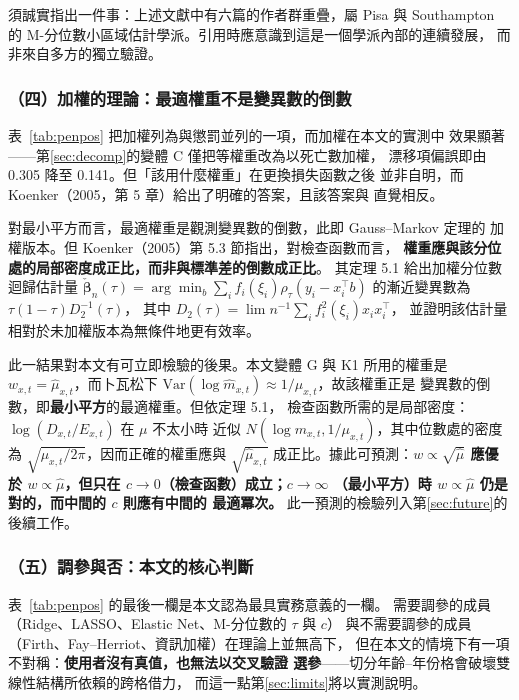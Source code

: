 \documentclass[UTF8, fontset=macnew, a4paper, 12pt]{ctexart}
\begin{document}
須誠實指出一件事：上述文獻中有六篇的作者群重疊，屬 Pisa 與 Southampton
的 M-分位數小區域估計學派。引用時應意識到這是一個學派內部的連續發展，
而非來自多方的獨立驗證。

\subsubsection{（四）加權的理論：最適權重不是變異數的倒數}\label{sec:wtheory}

表~\ref{tab:penpos} 把加權列為與懲罰並列的一項，而加權在本文的實測中
效果顯著——第\ref{sec:decomp}的變體 C 僅把等權重改為以死亡數加權，
漂移項偏誤即由 0.305 降至 0.141。但「該用什麼權重」在更換損失函數之後
並非自明，而 Koenker（2005，第 5 章）給出了明確的答案，且該答案與
直覺相反。

對最小平方而言，最適權重是觀測變異數的倒數，此即 Gauss--Markov 定理的
加權版本。但 Koenker（2005）第 5.3 節指出，對檢查函數而言，
\textbf{權重應與該分位處的局部密度成正比，而非與標準差的倒數成正比}。
其定理 5.1 給出加權分位數迴歸估計量
$\check{\boldsymbol\beta}_n(\tau)=\arg\min_b\sum_i f_i(\xi_i)
\rho_\tau(y_i-x_i^\top b)$ 的漸近變異數為 $\tau(1-\tau)D_2^{-1}(\tau)$，
其中 $D_2(\tau)=\lim n^{-1}\sum_i f_i^2(\xi_i)x_ix_i^\top$，
並證明該估計量相對於未加權版本為無條件地更有效率。

此一結果對本文有可立即檢驗的後果。本文變體 G 與 K1 所用的權重是
$w_{x,t}=\hat\mu_{x,t}$，而卜瓦松下
$\mathrm{Var}(\log\hat m_{x,t})\approx1/\mu_{x,t}$，故該權重正是
變異數的倒數，即\textbf{最小平方}的最適權重。但依定理 5.1，
檢查函數所需的是局部密度：$\log(D_{x,t}/E_{x,t})$ 在 $\mu$ 不太小時
近似 $N(\log m_{x,t},1/\mu_{x,t})$，其中位數處的密度為
$\sqrt{\mu_{x,t}/2\pi}$，因而正確的權重應與 $\sqrt{\hat\mu_{x,t}}$
成正比。據此可預測：\textbf{$w\propto\sqrt{\hat\mu}$ 應優於
$w\propto\hat\mu$，但只在 $c\to0$（檢查函數）成立；$c\to\infty$
（最小平方）時 $w\propto\hat\mu$ 仍是對的，而中間的 $c$ 則應有中間的
最適冪次。} 此一預測的檢驗列入第\ref{sec:future}的後續工作。

\subsubsection{（五）調參與否：本文的核心判斷}

表~\ref{tab:penpos} 的最後一欄是本文認為最具實務意義的一欄。
需要調參的成員（Ridge、LASSO、Elastic Net、M-分位數的 $\tau$ 與 $c$）
與不需要調參的成員（Firth、Fay--Herriot、資訊加權）在理論上並無高下，
但在本文的情境下有一項不對稱：\textbf{使用者沒有真值，也無法以交叉驗證
選參}——切分年齡--年份格會破壞雙線性結構所依賴的跨格借力，
而這一點第\ref{sec:limits}將以實測說明。
\end{document}
